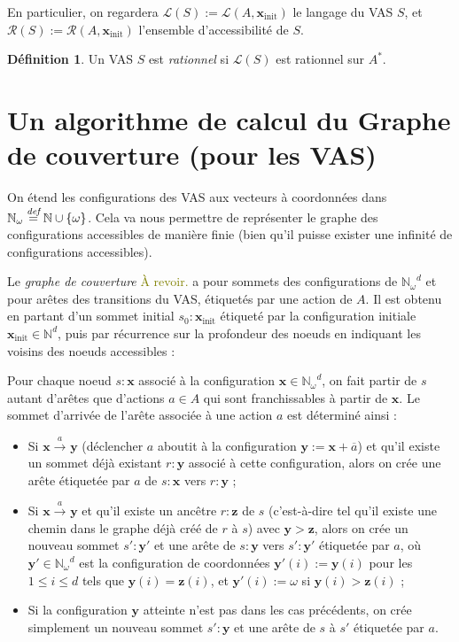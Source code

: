 \documentclass[a4paper,final]{article}
\theoremstyle{definition}
\newtheorem{Definition}[Theorem]{Définition}
\let\leq\leqslant
\newcommand{\lucas}[1]{\textcolor{olive}{#1}}
\newcommand{\os}[1]{\left\{\mathinner{#1}\right\}}
\newcommand{\defeq}{\ensuremath{\stackrel{\textit{def}}{=}}}
\let\union\cup
\newcommand{\N}{\ensuremath{\mathbb{N}}}
\newcommand{\Nomega}{\ensuremath{\mathbb{N}_\omega}}
\newcommand{\lang}{\ensuremath{\mathcal{L}}}
\newcommand{\conf}{\ensuremath{\mathcal{R}}}
\newcommand{\trans}[2]{\ensuremath{\stackrel{#1}{\longrightarrow}_{#2}}}
\newcommand{\vect}[1]{\ensuremath{\mathbf{#1}}}
\newcommand{\xinit}{\ensuremath{\vect{x}_\text{init}}}
\newcommand{\valeur}[1]{\ensuremath{\overline{#1}}}
\begin{document}
En particulier, on regardera $\lang(S):=\lang(A,\xinit)$ le langage du VAS $S$, et $\conf(S):=\conf(A,\xinit)$ l'ensemble d'accessibilité de $S$.

\begin{Definition}
Un VAS $S$ est \emph{rationnel} si $\lang(S)$ est rationnel sur $A^\ast$.
\end{Definition}

\section{Un algorithme de calcul du Graphe de couverture (pour les VAS)}

On étend les configurations des VAS aux vecteurs à coordonnées dans $\Nomega\defeq \N\union\os{\omega}$.
Cela va nous permettre de représenter le graphe des configurations accessibles de manière finie (bien qu'il puisse exister une infinité de configurations accessibles).

Le \emph{graphe de couverture} \lucas{À revoir.}
a pour sommets des configurations de $\Nomega^d$ et pour arêtes des transitions du VAS, étiquetés par une action de $A$.
Il est obtenu en partant d'un sommet initial $s_0:\xinit$ étiqueté par la configuration initiale $\xinit\in \N^d$, puis par récurrence sur la profondeur des noeuds en indiquant les voisins des noeuds accessibles :

Pour chaque noeud $s:\vect{x}$ associé à la configuration $\vect{x}\in \Nomega^d$, on fait partir de $s$ autant d'arêtes que d'actions $a\in A$ qui sont franchissables à partir de $\vect{x}$.
Le sommet d'arrivée de l'arête associée à une action $a$ est déterminé ainsi :
\begin{itemize}
    \item Si $\vect{x}\trans{a}{} \vect{y}$ (déclencher $a$ aboutit à la configuration $\vect{y} := \vect{x} + \valeur{a}$) 
    et qu'il existe un sommet déjà existant $r:\vect{y}$ associé à cette configuration, alors on crée une arête étiquetée par $a$ de $s:\vect{x}$ vers $r:\vect{y}$ ;
    \item Si $\vect{x}\trans{a}{} \vect{y}$ et qu'il existe un ancêtre $r:\vect{z}$ de $s$ (c'est-à-dire tel qu'il existe une chemin dans le graphe déjà créé de $r$ à $s$) avec $\vect{y}>\vect{z}$, 
    alors on crée un nouveau sommet $s':\vect{y'}$ et une arête de $s:\vect{y}$ vers $s':\vect{y'}$ étiquetée par $a$, 
    où $\vect{y'}\in \Nomega^d$ est la configuration de coordonnées $\vect{y'}(i):=\vect{y}(i)$ pour les $1\leq i\leq d$ tels que $\vect{y}(i)=\vect{z}(i)$, et $\vect{y'}(i):=\omega$ si $\vect{y}(i)>\vect{z}(i)$ ;
    \item Si la configuration $\vect{y}$ atteinte n'est pas dans les cas précédents, on crée simplement un nouveau sommet $s':\vect{y}$ et une arête de $s$ à $s'$ étiquetée par $a$.
\end{itemize}
\end{document}
